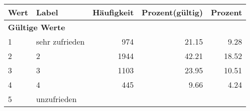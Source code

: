      \begin{longtable}{lXrrr}
     \toprule
     \textbf{Wert} & \textbf{Label} & \textbf{Häufigkeit} & \textbf{Prozent(gültig)} & \textbf{Prozent} \\
     \endhead
     \midrule
     \multicolumn{5}{l}{\textbf{Gültige Werte}}\\

     1 &
     \multicolumn{1}{X}{ sehr zufrieden   } &


       \num{974} &
       \num[round-mode=places,round-precision=2]{21,15} &
         \num[round-mode=places,round-precision=2]{9,28} \\

     2 &
     \multicolumn{1}{X}{ 2   } &


       \num{1944} &
       \num[round-mode=places,round-precision=2]{42,21} &
         \num[round-mode=places,round-precision=2]{18,52} \\

     3 &
     \multicolumn{1}{X}{ 3   } &


       \num{1103} &
       \num[round-mode=places,round-precision=2]{23,95} &
         \num[round-mode=places,round-precision=2]{10,51} \\

     4 &
     \multicolumn{1}{X}{ 4   } &


       \num{445} &
       \num[round-mode=places,round-precision=2]{9,66} &
         \num[round-mode=places,round-precision=2]{4,24} \\

     5 &
     \multicolumn{1}{X}{ unzufrieden   } &



\end{longtable}
